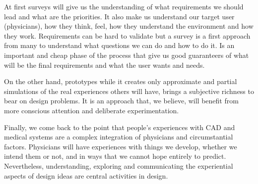 At first surveys will give us the understanding of what requirements we should lead and what are the priorities. It also make us understand our target user (physicians), how they think, feel, how they understand the environment and how they work. Requirements can be hard to validate but a survey is a first approach from many to understand what questions we can do and how to do it. Is an important and cheap phase of the process that give us good guaranteers of what will be the final requirements and what the user wants and needs.

On the other hand, prototypes while it creates only approximate and partial simulations of the real experiences others will have, brings a subjective richness to bear on design problems. It is an approach that, we believe, will benefit from more conscious attention and deliberate experimentation.

Finally, we come back to the point that people's experiences with CAD and medical systems are a complex integration of physicians and circumstantial factors. Physicians will have experiences with things we develop, whether we intend them or not, and in ways that we cannot hope entirely to predict. Nevertheless, understanding, exploring and communicating the experiential aspects of design ideas are central activities in design.

\clearpage

\begin{thebibliography}{}
\bibitem{}
\end{thebibliography}





